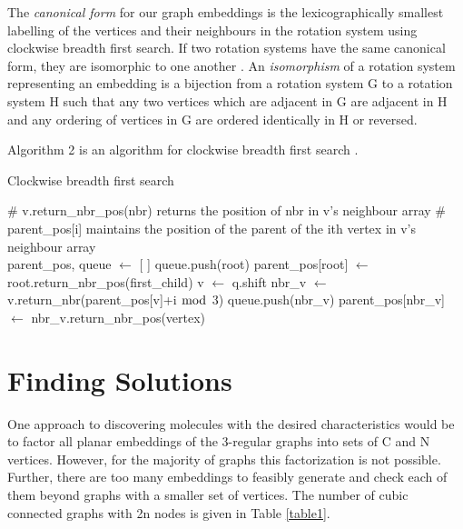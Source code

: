 \documentclass[12pt]{article}
\begin{document}
The \textit{canonical form} for our graph embeddings is the lexicographically smallest labelling of the vertices and their neighbours in the rotation system using clockwise breadth first search. If two rotation systems have the same canonical form, they are isomorphic to one another \cite{WM4}. An \textit{isomorphism} of a rotation system representing an embedding is a bijection from a rotation system G to a rotation system H such that any two vertices which are adjacent in G are adjacent in H and any ordering of vertices in G are ordered identically in H or reversed. 

Algorithm 2 is an algorithm for clockwise breadth first search \cite{WM2}.

\begin{algorithm}[H]
\caption{Clockwise breadth first search}\label{euclid}
\begin{algorithmic}[1]
\scriptsize
{}
    \State \# v.return\_nbr\_pos(nbr) returns the position of nbr in v's neighbour array 
    \State \# parent\_pos[i] maintains the position of the parent of the ith vertex in v's neighbour array \\
    \State parent\_pos, queue $\gets$ [ ]
    \State queue.push(root)
    \State parent\_pos[root] $\gets$ root.return\_nbr\_pos(first\_child)
        \State v $\gets$ q.shift
            \State nbr\_v $\gets$ v.return\_nbr(parent\_pos[v]+i $\bmod$ 3)
                \State queue.push(nbr\_v)
                \State parent\_pos[nbr\_v] $\gets$ nbr\_v.return\_nbr\_pos(vertex)
            \EndIf
        \EndFor
    \EndWhile           
\EndProcedure
\end{algorithmic}
\end{algorithm}


\section{Finding Solutions}
One approach to discovering molecules with the desired characteristics would be to factor all planar embeddings of the 3-regular graphs into sets of C and N vertices. However, for the majority of graphs this factorization is not possible. Further, there are too many embeddings to feasibly generate and check each of them beyond graphs with a smaller set of vertices. The number of cubic connected graphs with 2n nodes is given in Table \ref{table1}.
\end{document}
